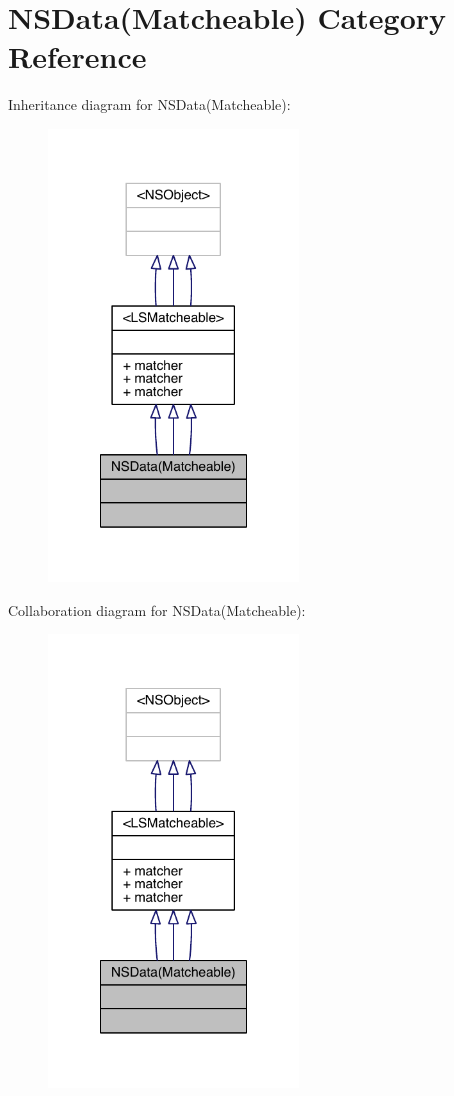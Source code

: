 \hypertarget{category_n_s_data_07_matcheable_08}{\section{N\-S\-Data(Matcheable) Category Reference}
\label{category_n_s_data_07_matcheable_08}
}


Inheritance diagram for N\-S\-Data(Matcheable)\-:\nopagebreak
\begin{figure}[H]
\begin{center}
\leavevmode
\includegraphics[width=188pt]{category_n_s_data_07_matcheable_08__inherit__graph}
\end{center}
\end{figure}


Collaboration diagram for N\-S\-Data(Matcheable)\-:\nopagebreak
\begin{figure}[H]
\begin{center}
\leavevmode
\includegraphics[width=188pt]{category_n_s_data_07_matcheable_08__coll__graph}
\end{center}
\end{figure}
